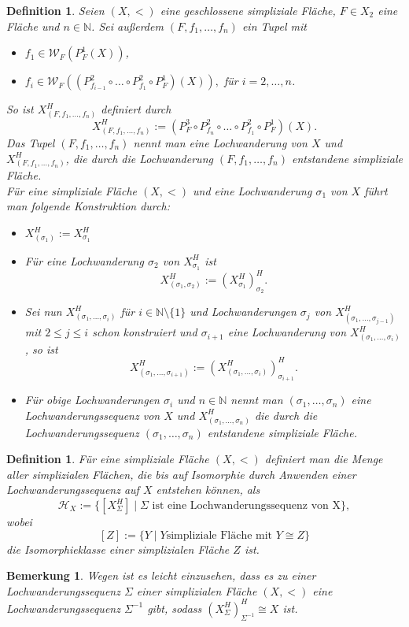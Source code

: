 \documentclass[12pt,titlepage,twoside,cleardoublepage]{article}
\theoremstyle{nummermitklammern}
\newtheorem{definition}[temp]{Definition}
\newtheorem{bemerkung}[temp]{Bemerkung}
\newtheorem{definition}[zahl]{Definition}
\newtheorem{bemerkung}[zahl]{Bemerkung}
\numberwithin{equation}{section}
\begin{document}
\begin{definition}
Seien $(X,<)$ eine geschlossene simpliziale Fläche, $F \in X_2$ eine Fläche und $n\in \mathbb{N}$. Sei außerdem $(F,f_1,\ldots,f_n)$ ein Tupel mit
\begin{itemize}
\item $f_1 \in \mathcal{W}_F(P_F^1(X))$,
\item $f_i \in \mathcal{W}_F((P^2_{f_{i-1}} \circ \ldots \circ P^2_{f_1}\circ P_F^1 )(X)),$ für $i=2,\ldots ,n$.
\end{itemize}
So ist $X_{(F,f_1,\ldots,f_n)}^H$ definiert durch 
\[
X^{H}_{(F,f_1,\ldots,f_n)}:=(P_F^3\circ P^2_{f_n} \circ \ldots \circ P^2_{f_1}\circ P_F^1)(X).
\]
Das Tupel $(F,f_1,\ldots,f_n)$ nennt man eine \emph{Lochwanderung von $X$} und $X^H_{(F,f_1,\ldots,f_n)}$, die durch die Lochwanderung $(F,f_1,\ldots,f_n)$ entstandene simpliziale Fläche.\\
Für eine simpliziale Fläche $(X,<)$ und eine Lochwanderung $\sigma_1$ von $X$ führt man folgende Konstruktion durch:
\begin{itemize}
\item $X^H_{(\sigma_1)}:=X^H_{\sigma_1}$
\item Für eine Lochwanderung $\sigma_2$ von $X^H_{\sigma_1}$ ist 
\[
X^H_{(\sigma_1,\sigma_2)}:=(X_{\sigma_1}^H)^H_{\sigma_2}.
\]
\item Sei nun  $X_{(\sigma_1,\ldots, \sigma_i)}^H$ für $i\in \mathbb{N}\setminus\{1\}$ und Lochwanderungen $\sigma_j$ von $X^H_{(\sigma_1,\ldots,\sigma_{j-1})}$ mit $2 \leq j \leq i$ schon konstruiert und $\sigma_{i+1}$ eine Lochwanderung von $X_{(\sigma_1,\ldots, \sigma_i)}^H$, so ist
\[
X_{(\sigma_1,\ldots, \sigma_{i+1})}^H:=(X_{(\sigma_1,\ldots, \sigma_i)}^H)^H_{\sigma_{i+1}}.
\]
\item Für obige Lochwanderungen $\sigma_i$ und $n \in \mathbb{N}$ nennt man $(\sigma_1, \ldots,\sigma_n)$ eine \emph{Lochwanderungssequenz von $X$} und $X^H_{(\sigma_1,\ldots,\sigma_n)}$ die durch die Lochwanderungssequenz $(\sigma_1,\ldots,\sigma_n)$ entstandene simpliziale Fläche.
\end{itemize}
\end{definition}


\begin{definition}
Für eine simpliziale Fläche $(X,<)$ definiert man die Menge aller simplizialen Flächen, die bis auf Isomorphie durch Anwenden einer Lochwanderungssequenz auf $X$ entstehen können, als
\[
\mathcal{H}_X:=\{[X_{\Sigma}^H] \mid \Sigma \text{ ist eine Lochwanderungssequenz von X}\},
\]
wobei
\[
 [Z] := \{Y \mid Y \text{simpliziale Fläche mit } Y \cong Z\}
\] die \emph{Isomorphieklasse} einer simplizialen Fläche  $Z$ ist. 

\end{definition}
\begin{bemerkung}\label{beminv}
Wegen  ist es leicht einzusehen, dass es zu einer Lochwanderungssequenz $\Sigma$ einer simplizialen Fläche $(X,<)$ eine Lochwanderungssequenz $\Sigma^{-1}$ gibt, sodass ${(X^H_{\Sigma})}^H_{\Sigma^{-1}} \cong X$ ist.
\end{bemerkung}
\end{document}
